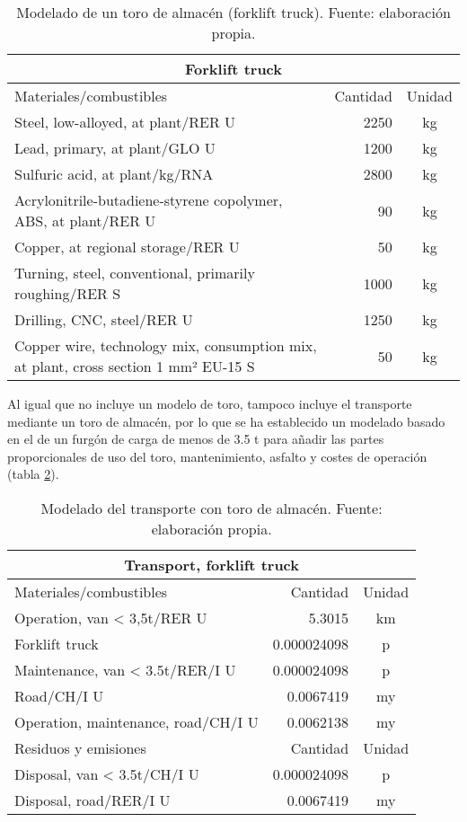 \begin{table}[!htb]
\centering
\begin{tabular}{p{8cm}rc}
\toprule
\multicolumn{3}{c}{Forklift truck}\\
\midrule
Materiales/combustibles & Cantidad & Unidad\\
\midrule
Steel, low-alloyed, at plant/RER U & 2250 & \si{kg}\\
Lead, primary, at plant/GLO U & 1200 & \si{kg}\\
Sulfuric acid, at plant/kg/RNA & 2800 & \si{kg}\\
Acrylonitrile-butadiene-styrene copolymer, ABS, at plant/RER U & 90 & \si{kg}\\
Copper, at regional storage/RER U & 50 & \si{kg}\\
Turning, steel, conventional, primarily roughing/RER S & 1000 & \si{kg}\\
Drilling, CNC, steel/RER U & 1250 & \si{kg}\\
Copper wire, technology mix, consumption mix, at plant, cross section 1 mm² EU-15 S & 50 & \si{kg}\\
\bottomrule
\end{tabular}
\caption[Modelado de un toro de almacén (forklift truck).]{Modelado de un toro de almacén (forklift truck). Fuente: elaboración propia.}
\label{modeladoforklift}
\end{table}

Al igual que no incluye un modelo de toro, tampoco incluye el transporte mediante un toro de almacén, por lo que se ha establecido un modelado basado en el de un furgón de carga de menos de 3.5 \si{\tonne} para añadir las partes proporcionales de uso del toro, mantenimiento, asfalto y costes de operación (tabla \ref{modeladotransporteforklift}).

\begin{table}[!htb]
\centering
\begin{tabular}{p{8cm}rc}
\toprule
\multicolumn{3}{c}{Transport, forklift truck}\\
\midrule
Materiales/combustibles & Cantidad & Unidad\\
\midrule
Operation, van < 3,5t/RER U & 5.3015 & \si{km}\\
Forklift truck & 0.000024098 & p\\
Maintenance, van < 3.5t/RER/I U & 0.000024098 & p\\
Road/CH/I U & 0.0067419 & \si{my}\\
Operation, maintenance, road/CH/I U & 0.0062138 & \si{my}\\
\midrule
Residuos y emisiones & Cantidad & Unidad\\
Disposal, van < 3.5t/CH/I U & 0.000024098 & p\\
Disposal, road/RER/I U & 0.0067419 & \si{my}\\
\midrule
\bottomrule
\end{tabular}
\caption[Modelado del transporte con toro de almacén.]{Modelado del transporte con toro de almacén. Fuente: elaboración propia.}
\label{modeladotransporteforklift}
\end{table}

